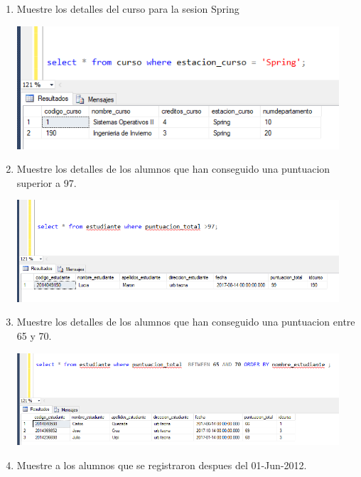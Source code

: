 \documentclass[12pt,letterpaper]{article}
\begin{document}
\begin{enumerate}[1.]
    \item Muestre los detalles del curso para la sesion Spring

\begin{center}
\includegraphics[width=12cm]{./IMAGENES/imagen1}
\end{center}

    
    \item Muestre los detalles de los alumnos que han conseguido una puntuacion superior a 97.
    
 
\begin{center}
\includegraphics[width=12cm]{./IMAGENES/imagen2}
\end{center}


    \item Muestre los detalles de los alumnos que han conseguido una puntuacion entre 65 y 70.

\begin{center}
\includegraphics[width=12cm]{./IMAGENES/imagen3}
\end{center}


    
    \item Muestre a los alumnos que se registraron despues del 01-Jun-2012.
    


\end{enumerate}
\end{document}
